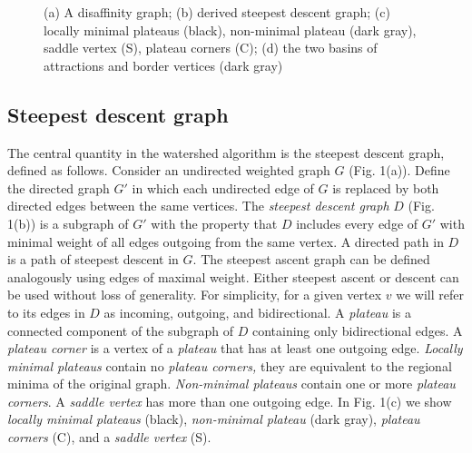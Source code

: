 \documentclass[10pt, conference, compsocconf]{IEEEtran}
\begin{document}
\begin{figure}

  \protect\caption{(a) A disaffinity graph; (b) derived steepest
    descent graph; (c) locally minimal plateaus (black), non-minimal
    plateau (dark gray), saddle vertex (S), plateau corners (C); (d)
    the two basins of attractions and border vertices (dark gray)}
\end{figure}


\subsection{Steepest descent graph}

The central quantity in the watershed algorithm is the steepest
descent graph, defined as follows. Consider an undirected weighted
graph $G$ (Fig. 1(a)). Define the directed graph $G'$ in which each
undirected edge of $G$ is replaced by both directed edges between the
same vertices. The \emph{steepest descent graph} $D$ (Fig. 1(b)) is a
subgraph of $G'$ with the property that $D$ includes every edge of
$G'$ with minimal weight of all edges outgoing from the same vertex. A
directed path in $D$ is a path of steepest descent in $G$. The
steepest ascent graph can be defined analogously using edges of
maximal weight. Either steepest ascent or descent can be used without
loss of generality. For simplicity, for a given vertex $v$ we will
refer to its edges in $D$ as incoming, outgoing, and bidirectional. A
\emph{plateau} is a connected component of the subgraph of $D$
containing only bidirectional edges. A \emph{plateau corner} is a
vertex of a \emph{plateau} that has at least one outgoing
edge. \emph{Locally minimal plateaus} contain no \emph{plateau
  corners,} they are equivalent to the regional minima of the original
graph. \emph{Non-minimal plateaus} contain one or more \emph{plateau
  corners}. A \emph{saddle vertex} has more than one outgoing edge. In
Fig. 1(c) we show \emph{locally minimal plateaus }(black),
\emph{non-minimal plateau} (dark gray), \emph{plateau corners} (C),
and a\emph{ saddle vertex} (S).
\end{document}
